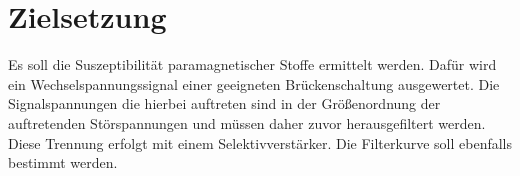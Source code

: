 \section{Zielsetzung}
\label{sec:Zielsetzung}

Es soll die Suszeptibilität paramagnetischer Stoffe ermittelt werden.
Dafür wird ein Wechselspannungssignal einer geeigneten Brückenschaltung ausgewertet.
Die Signalspannungen die hierbei auftreten sind in der Größenordnung der auftretenden Störspannungen und müssen daher zuvor herausgefiltert werden.
Diese Trennung erfolgt mit einem Selektivverstärker.
Die Filterkurve soll ebenfalls bestimmt werden.
